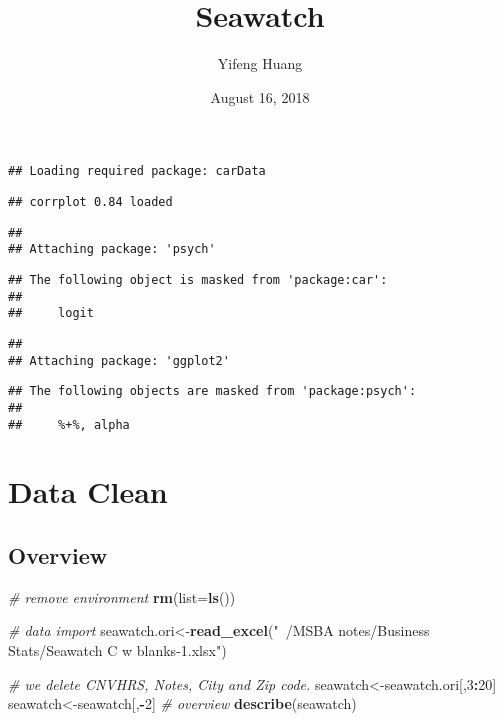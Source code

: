 \documentclass[]{article}
\title{Seawatch}
\author{Yifeng Huang}
\date{August 16, 2018}
\newenvironment{Shaded}{\begin{snugshade}}{\end{snugshade}}
\newcommand{\KeywordTok}[1]{\textcolor[rgb]{0.13,0.29,0.53}{\textbf{#1}}}
\newcommand{\DataTypeTok}[1]{\textcolor[rgb]{0.13,0.29,0.53}{#1}}
\newcommand{\DecValTok}[1]{\textcolor[rgb]{0.00,0.00,0.81}{#1}}
\newcommand{\StringTok}[1]{\textcolor[rgb]{0.31,0.60,0.02}{#1}}
\newcommand{\CommentTok}[1]{\textcolor[rgb]{0.56,0.35,0.01}{\textit{#1}}}
\newcommand{\OperatorTok}[1]{\textcolor[rgb]{0.81,0.36,0.00}{\textbf{#1}}}
\newcommand{\NormalTok}[1]{#1}
\begin{document}
\maketitle

\begin{verbatim}
## Loading required package: carData
\end{verbatim}

\begin{verbatim}
## corrplot 0.84 loaded
\end{verbatim}

\begin{verbatim}
## 
## Attaching package: 'psych'
\end{verbatim}

\begin{verbatim}
## The following object is masked from 'package:car':
## 
##     logit
\end{verbatim}

\begin{verbatim}
## 
## Attaching package: 'ggplot2'
\end{verbatim}

\begin{verbatim}
## The following objects are masked from 'package:psych':
## 
##     %+%, alpha
\end{verbatim}

\section{Data Clean}\label{data-clean}

\subsection{Overview}\label{overview}

\begin{Shaded}
\begin{Highlighting}[]
\CommentTok{# remove environment}
\KeywordTok{rm}\NormalTok{(}\DataTypeTok{list=}\KeywordTok{ls}\NormalTok{())}

\CommentTok{# data import}
\NormalTok{seawatch.ori<-}\KeywordTok{read_excel}\NormalTok{(}\StringTok{"~/MSBA notes/Business Stats/Seawatch C w blanks-1.xlsx"}\NormalTok{)}

\CommentTok{# we delete CNVHRS, Notes, City and Zip code. }
\NormalTok{seawatch<-seawatch.ori[,}\DecValTok{3}\OperatorTok{:}\DecValTok{20}\NormalTok{]}
\NormalTok{seawatch<-seawatch[,}\OperatorTok{-}\DecValTok{2}\NormalTok{] }
\CommentTok{# overview}
\KeywordTok{describe}\NormalTok{(seawatch)}
\end{Highlighting}
\end{Shaded}
\end{document}
